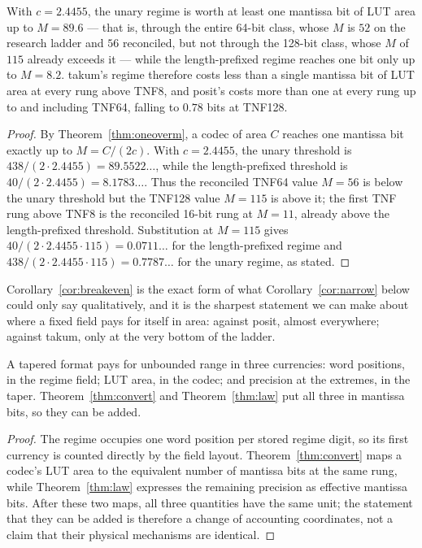 \begin{corollary}
\label{cor:breakeven}
With $c = 2.4455$, the unary regime is worth at least one mantissa bit of LUT area
up to $M = 89.6$ --- that is, through the entire 64-bit class, whose $M$ is $52$ on
the research ladder and $56$ reconciled, but not through the 128-bit class, whose
$M$ of $115$ already exceeds it --- while the length-prefixed regime reaches one
bit only up to $M = 8.2$. takum's regime therefore costs less than a single
mantissa bit of LUT area at every rung above TNF8, and posit's costs more than one
at every rung up to and including TNF64, falling to $0.78$ bits at TNF128.
\end{corollary}
\begin{proof}
By Theorem~\ref{thm:oneoverm}, a codec of area $C$ reaches one mantissa bit
exactly up to $M=C/(2c)$. With $c=2.4455$, the unary threshold is
$438/(2\cdot2.4455)=89.5522\ldots$, while the length-prefixed threshold is
$40/(2\cdot2.4455)=8.1783\ldots$. Thus the reconciled TNF64 value $M=56$ is
below the unary threshold but the TNF128 value $M=115$ is above it; the first
TNF rung above TNF8 is the reconciled 16-bit rung at $M=11$, already above
the length-prefixed threshold.
Substitution at $M=115$ gives $40/(2\cdot2.4455\cdot115)=0.0711\ldots$ for
the length-prefixed regime and $438/(2\cdot2.4455\cdot115)=0.7787\ldots$ for
the unary regime, as stated.
\end{proof}

Corollary~\ref{cor:breakeven} is the exact form of what
Corollary~\ref{cor:narrow} below could only say qualitatively, and it is the sharpest
statement we can make about where a fixed field pays for itself in area: against
posit, almost everywhere; against takum, only at the very bottom of the ladder.

\begin{corollary}
\label{cor:three}
A tapered format pays for unbounded range in three currencies: word positions,
in the regime field; LUT area, in the codec; and precision at the extremes, in the
taper. Theorem~\ref{thm:convert} and Theorem~\ref{thm:law} put all three in
mantissa bits, so they can be added.
\end{corollary}
\begin{proof}
The regime occupies one word position per stored regime digit, so its first currency
is counted directly by the field layout. Theorem~\ref{thm:convert} maps a codec's
LUT area to the equivalent number of mantissa bits at the same rung, while
Theorem~\ref{thm:law} expresses the remaining precision as effective mantissa bits.
After these two maps, all three quantities have the same unit; the statement that
they can be added is therefore a change of accounting coordinates, not a claim that
their physical mechanisms are identical.
\end{proof}

